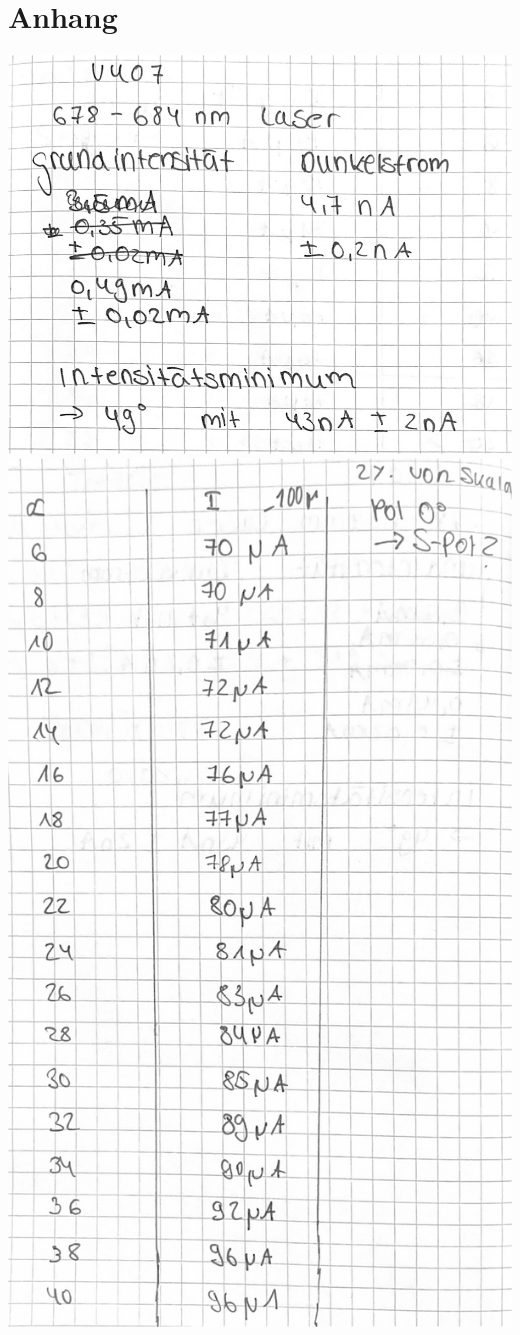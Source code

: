 \section*{Anhang}


\centering

\null\vfill
\includegraphics[width=0.75\linewidth]{content/messung/1.jpg}
\vfill\null
\newpage
\null\vfill
\includegraphics[width=0.75\linewidth]{content/messung/2.jpg}

